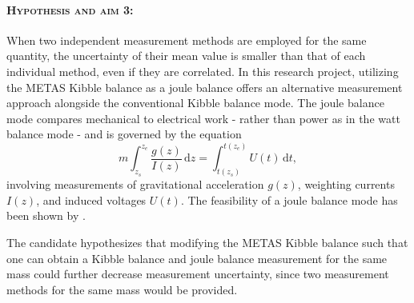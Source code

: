 \documentclass{article}
\begin{document}
\paragraph*{\normalfont \textsc{Hypothesis and aim 3:}}
When two independent measurement methods are employed for the same quantity, the uncertainty of their mean value is smaller than that of each individual method, even if they are correlated. In this research project, utilizing the METAS Kibble balance as a joule balance offers an alternative measurement approach alongside the conventional Kibble balance mode. The joule balance mode compares mechanical to electrical work - rather than power as in the watt balance mode - and is governed by the equation \begin{equation}\label{eq:joulebalance}
	m\int_{z_s}^{z_e}\frac{g(z)}{I(z)}\,\mathrm{d}z = \int_{t(z_s)}^{t(z_e)} U(t)\,\mathrm{d}t,
\end{equation} involving measurements of gravitational acceleration $g(z)$, weighting currents $I(z)$, and induced voltages $U(t)$. The feasibility of a joule balance mode has been shown by \cite{Xu_2016}.

The candidate hypothesizes that modifying the METAS Kibble balance such that one can obtain a Kibble balance and joule balance measurement for the same mass could further decrease measurement uncertainty, since two measurement methods for the same mass would be provided.
\end{document}
